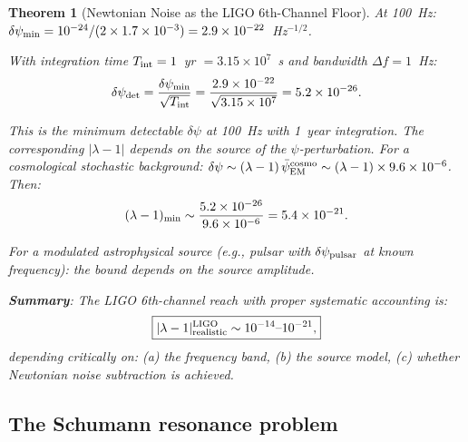 \documentclass[11pt]{article}
\newcommand{\lam}{\lambda}
\newcommand{\ee}[1]{\times 10^{#1}}
\newcommand{\lbone}{|\lam - 1|}
\newcommand{\psiEM}{\bar{\psi}_{\rm EM}}
\newtheorem{theorem}{Theorem}[section]
\theoremstyle{definition}
\theoremstyle{remark}
\begin{document}
\begin{theorem}[Newtonian Noise as the LIGO 6th-Channel Floor]
At 100~Hz: $\delta\psi_{\rm min} = 10^{-24}/(2\times 1.7\ee{-3})
= 2.9\ee{-22}$~Hz$^{-1/2}$.

With integration time $T_{\rm int} = 1$~yr $= 3.15\ee{7}$~s and
bandwidth $\Delta f = 1$~Hz:
\begin{equation}
\delta\psi_{\rm det} = \frac{\delta\psi_{\rm min}}{\sqrt{T_{\rm int}}}
= \frac{2.9\ee{-22}}{\sqrt{3.15\ee{7}}}
= 5.2\ee{-26}.
\end{equation}

This is the minimum detectable $\delta\psi$ at 100~Hz with 1~year
integration. The corresponding $\lbone$ depends on the \emph{source}
of the $\psi$-perturbation. For a cosmological stochastic background:
$\delta\psi \sim (\lam-1)\,\psiEM^{\rm cosmo} \sim (\lam-1)\times 9.6\ee{-6}$.
Then:
\begin{equation}
(\lam-1)_{\rm min} \sim \frac{5.2\ee{-26}}{9.6\ee{-6}} = 5.4\ee{-21}.
\end{equation}

For a modulated astrophysical source (e.g., pulsar with $\delta\psi_{\rm pulsar}$
at known frequency): the bound depends on the source amplitude.

\textbf{Summary}: The LIGO 6th-channel reach with proper systematic
accounting is:
\begin{equation}
\boxed{
\lbone^{\rm LIGO}_{\rm realistic} \sim 10^{-14}\text{--}10^{-21},
}
\end{equation}
depending critically on: (a) the frequency band, (b) the source model,
(c) whether Newtonian noise subtraction is achieved.
\end{theorem}

\subsection{The Schumann resonance problem}
\label{ssec:schumann}
\end{document}
